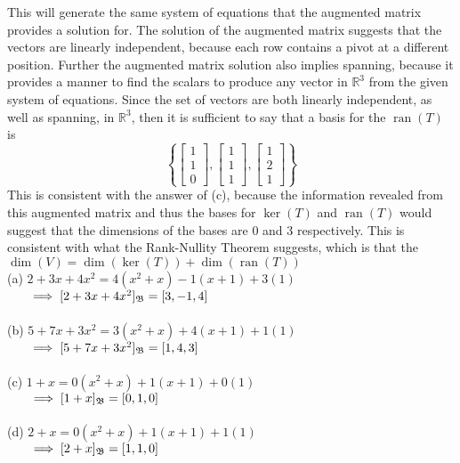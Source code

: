 \documentclass{report}
\begin{document}
This will generate the same system of equations that the augmented matrix provides a solution for.  The solution of the augmented matrix suggests that the vectors are linearly independent,  because each row contains a pivot at a different position.  Further the augmented matrix solution also implies spanning,  because it provides a manner to find the scalars to produce any vector in $\mathbb{R}^3$ from the given system of equations.  Since the set of vectors are both linearly independent,  as well as spanning,  in $\mathbb{R}^3$,  then it is sufficient to say that a basis for the $\operatorname{ran}(T)$ is
$$
\left\{
\begin{bmatrix} 1 \\ 1 \\ 0 \end{bmatrix},  \begin{bmatrix} 1 \\ 1 \\ 1 \end{bmatrix}, \begin{bmatrix} 1 \\ 2 \\ 1 \end{bmatrix}\right\}
$$
This is consistent with the answer of (c),  because the information revealed from this augmented matrix and thus the bases for $\operatorname{ker}(T)$ and $\operatorname{ran}(T)$ would suggest that the dimensions of the bases are 0 and 3 respectively.  This is consistent with what the Rank-Nullity Theorem suggests,  which is that the $\operatorname{dim}(V) = \operatorname{dim}(\operatorname{ker}(T)) + \operatorname{dim}(\operatorname{ran}(T))$ 
\sol \\
(a) $2+3x+4x^2 = 4(x^2+x) - 1(x+1) + 3(1)$ \\
$\indent\implies [2+3x+4x^2]_{\mathfrak{B}} = [3,  -1,  4]$ \\
\\
(b) $5 + 7x + 3x^2 = 3(x^2+x) + 4(x+1) + 1(1)$ \\
$\indent\implies [5+7x+3x^2]_{\mathfrak{B}} = [1,  4,  3]$ \\
\\
(c) $1 + x = 0(x^2+x) + 1(x+1) + 0(1)$ \\
$\indent\implies [1+x]_{\mathfrak{B}} = [0,  1,  0]$ \\
\\
(d) $2 + x = 0(x^2+x) + 1(x+1) + 1(1)$ \\
$\indent\implies [2+x]_{\mathfrak{B}} = [1,  1,  0]$
\end{document}
